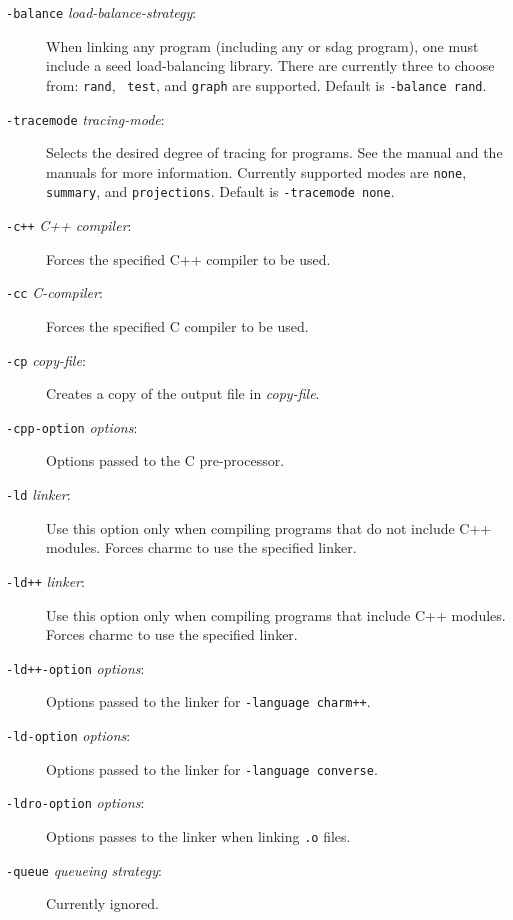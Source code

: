 \begin{description}
\item[{\tt -balance} {\em load-balance-strategy}:]

When linking any \converse{} program (including any \charmpp{} or sdag program),
one must include a seed load-balancing
library.  There are currently three to choose from: {\tt rand}, {\tt
test}, and {\tt graph} are supported.  Default is {\tt -balance rand}.

\item[{\tt -tracemode} {\em tracing-mode}:]

Selects the desired degree of tracing for \charmpp{} programs.
See the \charmpp{} manual and the \projections{} manuals for
more information.  Currently supported modes are {\tt none}, {\tt
summary}, and {\tt projections}. Default is {\tt -tracemode none}.


\item[{\tt -c++} {\em C++ compiler}:]

Forces the specified C++ compiler to be used.

\item[{\tt -cc} {\em C-compiler}:]

Forces the specified C compiler to be used.

\item[{\tt -cp} {\em copy-file}:]

Creates a copy of the output file in {\em copy-file}.

\item[{\tt -cpp-option} {\em options}:]

Options passed to the C pre-processor.

\item[{\tt -ld} {\em linker}:]

Use this option only when compiling programs that do not include C++
modules.  Forces charmc to use the specified linker.

\item[{\tt -ld++} {\em linker}:]

Use this option only when compiling programs that include C++
modules.  Forces charmc to use the specified linker.

\item[{\tt -ld++-option} {\em options}:]

Options passed to the linker for {\tt -language charm++}.

\item[{\tt -ld-option} {\em options}:]

Options passed to the linker for {\tt -language converse}.

\item[{\tt -ldro-option} {\em options}:]

Options passes to the linker when linking {\tt .o} files.

\item[{\tt -queue} {\em queueing strategy}:]

Currently ignored.

\end{description}
